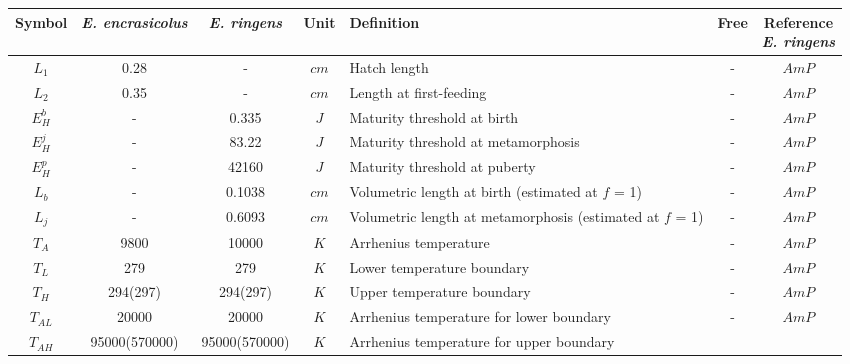 \begin{table}[ht]
\centering
\begin{adjustbox}{width=1.2\textwidth}
\begin{tabular}{c|c|c|c|l|c|c}
\hline
Symbol																&
\makecell[c]{\textit{E. encrasicolus} \\ {\cite{PethRoos2013}}}	&
\textit{E. ringens}													&
Unit																&
Definition															&
Free																&
\makecell[c]{Reference \\ \textit{E. ringens}}															\\
\hline
$L_{1}$			&
0.28			&
-				&
$cm$			&
Hatch length	&
-				&
$AmP$			\\
$L_{2}$						&
0.35						&
-							& 
$cm$						& 
Length at first-feeding		& 
-							&
$AmP$						\\
$E_{H}^{b}$						& 
-								& 
0.335							& 
$J$								& 
Maturity threshold at birth		& 
-								&
$AmP$							\\
$E_{H}^{j}$								&
-										& 
83.22									& 
$J$										& 
Maturity threshold at metamorphosis		& 
-										&
$AmP$									\\
$E_{H}^{p}$						& 
-								& 
42160							& 
$J$								& 
Maturity threshold at puberty	& 
-								&
$AmP$							\\
$L_{b}$												& 
-													& 
0.1038												& 
$cm$												& 
Volumetric length at birth (estimated at $f$ = 1)	& 
-													&
$AmP$												\\
$L_{j}$														& 
-															& 
0.6093														& 
$cm$														& 
Volumetric length at metamorphosis (estimated at $f$ = 1)	& 
-															&
$AmP$														\\
$T_{A}$					& 
9800					& 
10000					& 
$K$						& 
Arrhenius temperature	& 
-						&
$AmP$					\\
$T_{L}$						&
279							&
279							&
$K$							&
Lower temperature boundary	&
-							&
$AmP$						\\
$T_{H}$						&
294(297)					& 
294(297)					& 
$K$							& 
Upper temperature boundary	& 
-							&
$AmP$						\\
$T_{AL}$									& 
20000										& 
20000										& 
$K$											& 
Arrhenius temperature for lower boundary	&
-											&
$AmP$										\\
$T_{AH}$									& 
95000(570000)								& 
95000(570000)								& 
$K$											& 
Arrhenius temperature for upper boundary	& 

\end{tabular}
\end{adjustbox}
\end{table}
